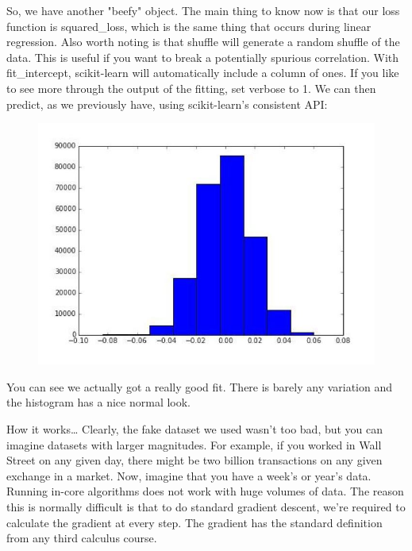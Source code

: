So, we have another "beefy" object. The main thing to know now is that our loss function is
squared_loss, which is the same thing that occurs during linear regression. Also worth
noting is that shuffle will generate a random shuffle of the data. This is useful if you want to
break a potentially spurious correlation. With fit_intercept, scikit-learn will automatically
include a column of ones. If you like to see more through the output of the fitting, set
verbose to 1.
We can then predict, as we previously have, using scikit-learn's consistent API:

\begin{figure}
\centering
\includegraphics[width=0.7\linewidth]{SKL19-SGD-histogram}
\caption{}
\label{fig:SKL19-SGD-histogram}
\end{figure}

You can see we actually got a really good fit. There is barely any variation and the histogram
has a nice normal look.

How it works…
Clearly, the fake dataset we used wasn't too bad, but you can imagine datasets with larger
magnitudes. For example, if you worked in Wall Street on any given day, there might be two
billion transactions on any given exchange in a market. Now, imagine that you have a week's
or year's data. Running in-core algorithms does not work with huge volumes of data.
The reason this is normally difficult is that to do standard gradient descent, we're required to
calculate the gradient at every step. The gradient has the standard definition from any third
calculus course.

